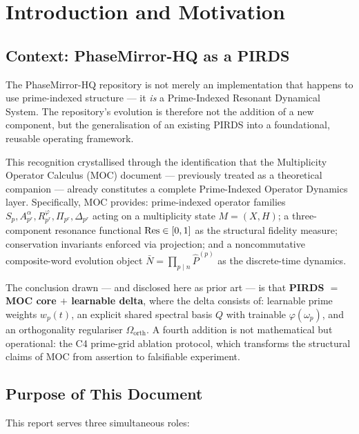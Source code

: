\documentclass[11pt,a4paper]{article}
\theoremstyle{plain}
\theoremstyle{definition}
\theoremstyle{remark}
\begin{document}
\tableofcontents
\newpage

\section{Introduction and Motivation}

\subsection{Context: PhaseMirror-HQ as a PIRDS}

The PhaseMirror-HQ repository is not merely an implementation that happens to use
prime-indexed structure --- it \emph{is} a Prime-Indexed Resonant Dynamical System.
The repository's evolution is therefore not the addition of a new component, but the
generalisation of an existing PIRDS into a foundational, reusable operating framework.

This recognition crystallised through the identification that the Multiplicity Operator
Calculus (MOC) document --- previously treated as a theoretical companion --- already
constitutes a complete Prime-Indexed Operator Dynamics layer. Specifically, MOC provides:
prime-indexed operator families $S_p, A_{p^r}^\alpha, R_{p^r}^\varphi, \Pi_{p^r},
\Delta_{p^r}$ acting on a multiplicity state $M = (X, H)$; a three-component resonance
functional $\Res \in [0,1]$ as the structural fidelity measure; conservation invariants
enforced via projection; and a noncommutative composite-word evolution object
$\bar{N} = \prod_{p \mid n} \hat{P}^{(p)}$ as the discrete-time dynamics.

The conclusion drawn --- and disclosed here as prior art --- is that \textbf{PIRDS $=$ MOC core $+$ learnable delta}, where the delta consists of: learnable prime weights $w_p(t)$, an explicit shared spectral basis $Q$ with trainable $\varphi(\omega_p)$, and an orthogonality regulariser $\Omega_\mathrm{orth}$. A fourth addition is not mathematical but operational: the C4 prime-grid ablation protocol, which transforms the structural claims of MOC from assertion to falsifiable experiment.

\subsection{Purpose of This Document}

This report serves three simultaneous roles:
\end{document}
